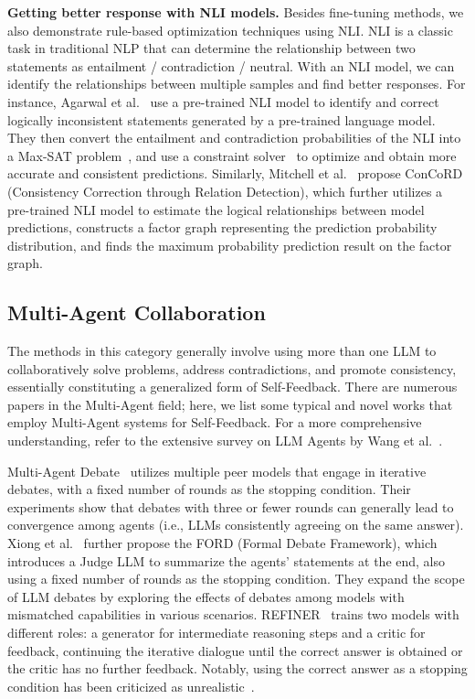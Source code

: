 \documentclass[lettersize,journal]{IEEEtran}
\begin{document}
\textbf{Getting better response with NLI models.} Besides fine-tuning methods, we also demonstrate rule-based optimization techniques using NLI. NLI is a classic task in traditional NLP that can determine the relationship between two statements as entailment / contradiction / neutral. With an NLI model, we can identify the relationships between multiple samples and find better responses. For instance, Agarwal et al.~\cite{NLIConsistency_22_CS224N_Stanford} use a pre-trained NLI model to identify and correct logically inconsistent statements generated by a pre-trained language model. They then convert the entailment and contradiction probabilities of the NLI into a Max-SAT problem~\cite{Battiti2009}, and use a constraint solver~\cite{ignatiev2019rc2} to optimize and obtain more accurate and consistent predictions. Similarly, Mitchell et al.~\cite{ConCoRD_22_EMNLP_Stanford} propose ConCoRD (Consistency Correction through Relation Detection), which further utilizes a pre-trained NLI model to estimate the logical relationships between model predictions, constructs a factor graph representing the prediction probability distribution, and finds the maximum probability prediction result on the factor graph.


\subsection{Multi-Agent Collaboration}  \label{sec:multi_agent}


\noindent The methods in this category generally involve using more than one LLM to collaboratively solve problems, address contradictions, and promote consistency, essentially constituting a generalized form of Self-Feedback. There are numerous papers in the Multi-Agent field; here, we list some typical and novel works that employ Multi-Agent systems for Self-Feedback. For a more comprehensive understanding, refer to the extensive survey on LLM Agents by Wang et al.~\cite{SurveyAgent_24_Frontiers_RUC}.

Multi-Agent Debate~\cite{Debate_23_arXiv_MIT} utilizes multiple peer models that engage in iterative debates, with a fixed number of rounds as the stopping condition. Their experiments show that debates with three or fewer rounds can generally lead to convergence among agents (i.e., LLMs consistently agreeing on the same answer). Xiong et al.~\cite{ModalCollaboration_23_EMNLP_HIT} further propose the FORD (Formal Debate Framework), which introduces a Judge LLM to summarize the agents' statements at the end, also using a fixed number of rounds as the stopping condition. They expand the scope of LLM debates by exploring the effects of debates among models with mismatched capabilities in various scenarios. REFINER~\cite{REFINER_24_EACL_EPFL} trains two models with different roles: a generator for intermediate reasoning steps and a critic for feedback, continuing the iterative dialogue until the correct answer is obtained or the critic has no further feedback. Notably, using the correct answer as a stopping condition has been criticized as unrealistic~\cite{TheoryNoReason_24_ICLR_Google}. 
\end{document}
